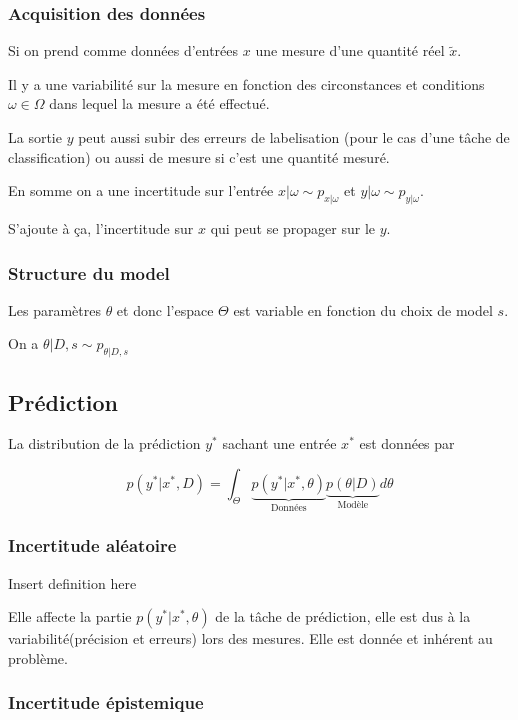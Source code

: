 \documentclass[french,12pt]{article}
\begin{document}
\subsubsection{Acquisition des données}
Si on prend comme données d'entrées $x$ une mesure d'une quantité réel $\tilde{x}$.

Il y a une variabilité sur la mesure en fonction des circonstances
et conditions $\omega \in \Omega$ dans lequel la mesure a été effectué.

La sortie $y$ peut aussi subir des erreurs de labelisation
(pour le cas d'une tâche de classification) ou aussi de mesure si c'est une quantité mesuré.

En somme on a une incertitude sur l'entrée $x | \omega \sim p_{x | \omega}$
et $y | \omega \sim p_{y | \omega}$.

S'ajoute à ça, l'incertitude sur $x$ qui peut se propager sur le $y$.

\subsubsection{Structure du model}

Les paramètres $\theta$ et donc l'espace $\Theta$ est variable en fonction du choix de model $s$.

On a $\theta | D,s \sim p_{\theta | D, s}$

\subsection{Prédiction}

La distribution de la prédiction $y^*$ sachant une entrée $x^*$ est données par

$$ p(y^* | x^*, D) = \int_{\Theta} \underbrace{p(y^* | x^*, \theta)}_{\text{Données}} \underbrace{p(\theta  | D)}_{\text{Modèle}} d \theta$$

\subsubsection{Incertitude aléatoire}

Insert definition here

Elle affecte la partie $p(y^* | x^*, \theta)$ de la tâche de prédiction,
elle est dus à la variabilité(précision et erreurs) lors des mesures.
Elle est donnée et inhérent au problème.

\subsubsection{Incertitude épistemique}
\end{document}
